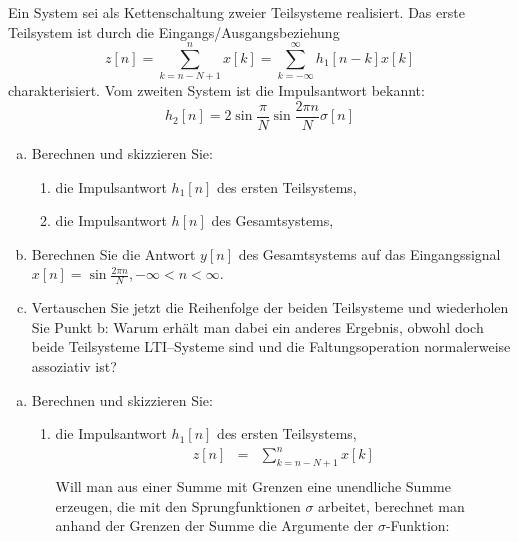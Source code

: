 \begin{uebsp}
\begin{Exercise}
Ein System sei als Kettenschaltung zweier Teilsysteme realisiert. Das erste
Teilsystem ist durch die Eingangs/Ausgangsbeziehung
\[z[n]=\sum_{k=n-N+1}^nx[k]=\sum_{k=-\infty}^\infty h_1[n-k]x[k]\]
charakterisiert. Vom zweiten System ist die Impulsantwort bekannt:
\[h_2[n]=2\sin\frac{\pi}{N}\sin\frac{2\pi n}{N}\sigma[n]\]

\begin{center}
\end{center}

\begin{enumerate}[a)]
    \item Berechnen und skizzieren Sie:
        \begin{enumerate}
            \item die Impulsantwort $h_1[n]$ des ersten Teilsystems,
            \item die Impulsantwort $h[n]$ des Gesamtsystems,
        \end{enumerate}
    \item Berechnen Sie die Antwort $y[n]$ des Gesamtsystems auf das
    Eingangssignal $x[n] = \sin\frac{2\pi n}{N}, -\infty < n < \infty$.
    \item Vertauschen Sie jetzt die Reihenfolge der beiden Teilsysteme und
    wiederholen Sie Punkt b: Warum erhält man dabei ein anderes Ergebnis, 
    obwohl doch beide Teilsysteme LTI–Systeme sind und die Faltungsoperation 
    normalerweise assoziativ ist?
\end{enumerate}
\end{Exercise}
\begin{Answer}
\begin{enumerate}[a)]
    \item Berechnen und skizzieren Sie:\\
        \begin{enumerate}
            \item die Impulsantwort $h_1[n]$ des ersten Teilsystems,
                \begin{eqnarray*}
                    z[n]&=&\sum_{k=n-N+1}^n x[k]\\
                \end{eqnarray*}
                Will man aus einer Summe mit Grenzen eine unendliche Summe erzeugen, die
                mit den Sprungfunktionen $\sigma$ arbeitet, berechnet man anhand der
                Grenzen der Summe die Argumente der $\sigma$-Funktion:


\end{enumerate}
\end{enumerate}
\end{Answer}
\end{uebsp}
